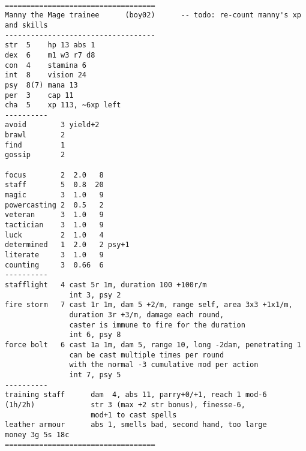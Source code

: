 \


\goodbreak
\tiny \begin{samepage} \begin{verbatim}
===================================
Manny the Mage trainee      (boy02)      -- todo: re-count manny's xp and skills
-----------------------------------
str  5    hp 13 abs 1
dex  6    m1 w3 r7 d8
con  4    stamina 6
int  8    vision 24
psy  8(7) mana 13
per  3    cap 11
cha  5    xp 113, ~6xp left
----------
avoid        3 yield+2
brawl        2
find         1
gossip       2

focus        2  2.0   8
staff        5  0.8  20
magic        3  1.0   9
powercasting 2  0.5   2
veteran      3  1.0   9
tactician    3  1.0   9
luck         2  1.0   4
determined   1  2.0   2 psy+1
literate     3  1.0   9
counting     3  0.66  6
----------
stafflight   4 cast 5r 1m, duration 100 +100r/m
               int 3, psy 2
fire storm   7 cast 1r 1m, dam 5 +2/m, range self, area 3x3 +1x1/m,
               duration 3r +3/m, damage each round,
               caster is immune to fire for the duration
               int 6, psy 8
force bolt   6 cast 1a 1m, dam 5, range 10, long -2dam, penetrating 1
               can be cast multiple times per round
               with the normal -3 cumulative mod per action
               int 7, psy 5
----------
training staff      dam  4, abs 11, parry+0/+1, reach 1 mod-6
(1h/2h)             str 3 (max +2 str bonus), finesse-6,
                    mod+1 to cast spells
leather armour      abs 1, smells bad, second hand, too large
money 3g 5s 18c
===================================
\end{verbatim} \end{samepage} \normalsize


\


